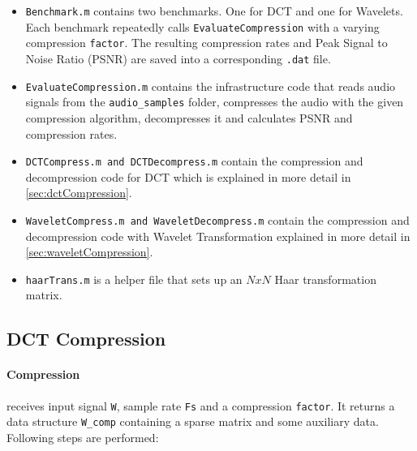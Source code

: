 \documentclass[a4paper]{scrartcl}
\begin{document}
\begin{itemize} 

\item \texttt{Benchmark.m} contains two benchmarks. One for DCT and one for
Wavelets. Each benchmark repeatedly calls \texttt{EvaluateCompression} with a
varying compression \texttt{factor}. The resulting compression rates and Peak
Signal to Noise Ratio (PSNR) are saved into a corresponding \texttt{.dat} file.

\item \texttt{EvaluateCompression.m} contains the infrastructure code that reads
audio signals from the \texttt{audio\_samples} folder, compresses the audio with
the given compression algorithm, decompresses it and calculates PSNR and
compression rates.

\item \texttt{DCTCompress.m and DCTDecompress.m} contain the
compression and decompression code for DCT which is explained in more detail in
\autoref{sec:dctCompression}.

\item \texttt{WaveletCompress.m and WaveletDecompress.m} contain the
compression and decompression code with Wavelet Transformation explained in more
detail in \autoref{sec:waveletCompression}.

\item \texttt{haarTrans.m} is a helper file that sets up an $NxN$
Haar transformation matrix.
\end{itemize}

\subsection{DCT Compression}
\label{sec:dctCompression}

\paragraph{Compression} receives input signal \texttt{W}, sample rate
\texttt{Fs} and a compression \texttt{factor}. It returns a data structure
\texttt{W\_comp} containing a sparse matrix and some auxiliary data. Following
steps are performed:
\end{document}
